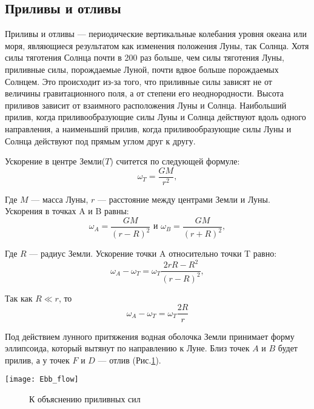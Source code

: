 \subsection{Приливы и отливы}

Приливы и отливы --- периодические вертикальные колебания уровня океана или моря, являющиеся результатом как изменения положения Луны, так Солнца. Хотя силы тяготения Солнца почти в 200 раз больше, чем силы тяготения Луны, приливные силы, порождаемые Луной, почти вдвое больше порождаемых Солнцем. Это происходит из-за того, что приливные силы зависят не от величины гравитационного поля, а от степени его неоднородности. Высота приливов зависит от взаимного расположения Луны и Солнца. Наибольший прилив, когда приливообразующие силы Луны и Солнца действуют вдоль одного направления, а наименьший прилив, когда приливообразующие силы Луны и Солнца действуют под прямым углом друг к другу.

Ускорение в центре Земли($T$) считется по следующей формуле: \begin{equation}\omega_T=\frac{GM}{r^2},
\end{equation}

Где $M$ --- масса Луны, $r$ --- расстояние между центрами Земли и Луны. Ускорения в точках A и B равны:
\begin{equation}\omega_A=\frac{GM}{(r-R)^2} \text{ и } \omega_B=\frac{GM}{(r+R)^2},
\end{equation}

Где $R$ --- радиус Земли. Ускорение точки A относительно точки T равно:
\begin{equation}\omega_A-\omega_T=\omega_T\frac{2rR-R^2}{(r-R)^2},
\end{equation}

Так как $R\ll r$, то \begin{equation}\omega_A-\omega_T=\omega_T\frac{2R}{r}
\end{equation}

Под действием лунного притяжения водная оболочка Земли принимает форму эллипсоида, который вытянут по направлению к Луне. Близ точек $A$ и $B$ будет прилив, а у точек $F$ и $D$ --- отлив (Рис.\ref{Ebb_flow}).
\begin{center}
\texttt{[image: Ebb\_flow]}
\begin{figure}[h!]
\caption{К объяснению приливных сил}\label{Ebb_flow}
\end{figure}
\end{center}
